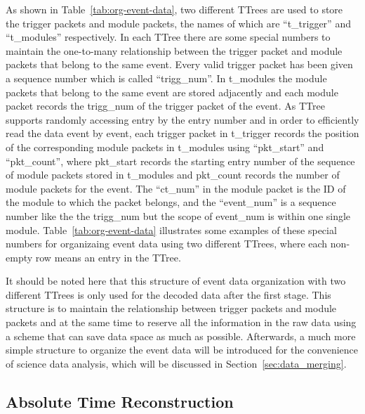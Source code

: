 \documentclass{raa}
\begin{document}
As shown in Table~\ref{tab:org-event-data}, two different TTrees are used to store the trigger packets and module packets, the names of which are ``t\_trigger'' and ``t\_modules'' respectively. In each TTree there are some special numbers to maintain the one-to-many relationship between the trigger packet and module packets that belong to the same event. Every valid trigger packet has been given a sequence number which is called ``trigg\_num''. In t\_modules the module packets that belong to the same event are stored adjacently and each module packet records the trigg\_num of the trigger packet of the event. As TTree supports randomly accessing entry by the entry number and in order to efficiently read the data event by event, each trigger packet in t\_trigger records the position of the corresponding module packets in t\_modules using ``pkt\_start'' and ``pkt\_count'', where pkt\_start records the starting entry number of the sequence of module packets stored in t\_modules and pkt\_count records the number of module packets for the event. The ``ct\_num'' in the module packet is the ID of the module to which the packet belongs, and the ``event\_num'' is a sequence number like the the trigg\_num but the scope of event\_num is within one single module. Table~\ref{tab:org-event-data} illustrates some examples of these special numbers for organizaing event data using two different TTrees, where each non-empty row means an entry in the TTree.

It should be noted here that this structure of event data organization with two different TTrees is only used for the decoded data after the first stage. This structure is to maintain the relationship between trigger packets and module packets and at the same time to reserve all the information in the raw data using a scheme that can save data space as much as possible. Afterwards, a much more simple structure to organize the event data will be introduced for the convenience of science data analysis, which will be discussed in Section~\ref{sec:data_merging}.

\subsection{Absolute Time Reconstruction}\label{sec:abs_time_recon}
\end{document}
